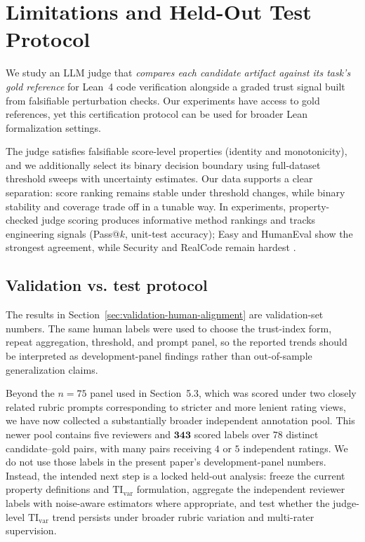 \documentclass{article}
\begin{document}
\section{Limitations and Held-Out Test Protocol}
We study an LLM judge that \emph{compares each candidate artifact against its task's gold reference} for Lean~4 code verification alongside a graded trust signal built from falsifiable perturbation checks. Our experiments have access to gold references, yet this certification protocol can be used for broader Lean formalization settings.

The judge satisfies falsifiable score-level properties (identity and monotonicity), and we additionally select its binary decision boundary using full-dataset threshold sweeps with uncertainty estimates.
Our data supports a clear separation: score ranking remains stable under threshold changes, while binary stability and coverage trade off in a tunable way.
In experiments, property-checked judge scoring produces informative method rankings and tracks engineering signals (Pass@$k$, unit-test accuracy); Easy and HumanEval show the strongest agreement, while Security and RealCode remain hardest \citep{chen2021evaluating}.

\subsection{Validation vs. test protocol}
The results in Section~\ref{sec:validation-human-alignment} are validation-set numbers. The same human labels were used to choose the trust-index form, repeat aggregation, threshold, and prompt panel, so the reported trends should be interpreted as development-panel findings rather than out-of-sample generalization claims.

Beyond the \(n=75\) panel used in Section~5.3, which was scored under two closely related rubric prompts corresponding to stricter and more lenient rating views, we have now collected a substantially broader independent annotation pool. This newer pool contains five reviewers and \(\mathbf{343}\) scored labels over \(78\) distinct candidate--gold pairs, with many pairs receiving \(4\) or \(5\) independent ratings. We do not use those labels in the present paper's development-panel numbers. Instead, the intended next step is a locked held-out analysis: freeze the current property definitions and \(\mathrm{TI}_{\mathrm{var}}\) formulation, aggregate the independent reviewer labels with noise-aware estimators where appropriate, and test whether the judge-level \(\mathrm{TI}_{\mathrm{var}}\) trend persists under broader rubric variation and multi-rater supervision.
\end{document}
